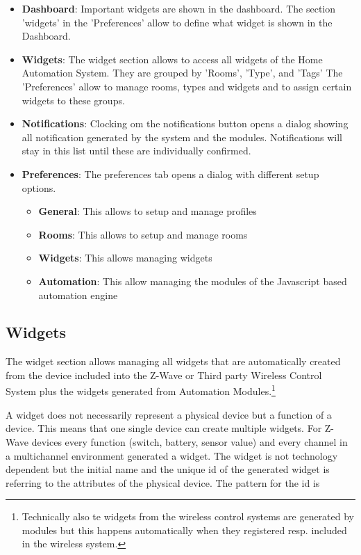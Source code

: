 \begin{itemize}
\item \textbf{Dashboard}: Important widgets are shown in the dashboard. The section 'widgets'
in the 'Preferences' allow to define what widget is shown in the Dashboard.
\item \textbf{Widgets}: The widget section allows to access all widgets of the Home 
Automation System. They are grouped by 'Rooms', 'Type', and 'Tags' The 'Preferences'
allow to manage rooms, types and widgets and to assign certain widgets to these groups.
\item \textbf{Notifications}: Clocking om the notifications button opens a dialog showing all 
notification generated by the system and the modules. Notifications will stay in this list
until these are individually confirmed.
\item \textbf{Preferences}: The preferences tab opens a dialog with different setup options.
\begin{itemize}
\item \textbf{General}:  This allows to setup and manage profiles
\item \textbf{Rooms}:  This allows to setup and manage rooms
\item \textbf{Widgets}:  This allows managing widgets
\item \textbf{Automation}:  This allow managing the modules of the Javascript based 
automation engine
\end{itemize}
\end{itemize}

\subsection{Widgets}

The widget section allows managing all widgets that are automatically created from the 
device included into the Z-Wave or Third party Wireless Control System plus the widgets
generated from Automation Modules.\footnote{Technically also te widgets from the wireless 
control systems are generated by modules but this happens automatically when they registered
resp. included in the wireless system.}

A widget does not necessarily represent a physical device but a function of a device.
This means that one single device can create multiple widgets.
For Z-Wave devices every function (switch, battery, sensor value) and every channel in 
a multichannel environment generated a widget. The widget is not technology dependent but 
the initial name and the unique id of the generated widget is referring to the attributes 
of the physical  device. The pattern for the id is

